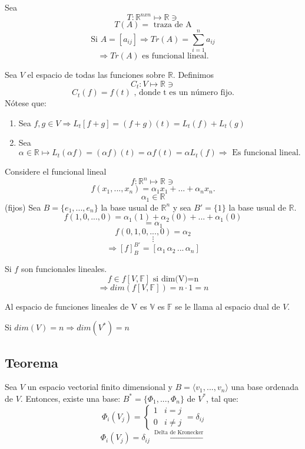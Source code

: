 \begin{exercise}
Sea $$T:\mathbb{R}^{nxn}\mapsto\mathbb{R}\ni$$
$$T(A)=\text{ traza de A}$$
$$\text{Si } A=[a_{ij}]\Rightarrow Tr(A) = \sum^n_{i=1}a_{ij}$$
$$\Rightarrow Tr(A) \text{ es funcional lineal.}$$
\end{exercise}
\begin{exercise}
Sea $V$ el espacio de todas las funciones sobre $\mathbb{R}$.
Definimos $$C_t: V\mapsto\mathbb{R}\ni$$
$$C_t(f)=f(t)\text{ , donde t es un número fijo.}$$
Nótese que:
\begin{enumerate}
    \item Sea $f,g\in V\Rightarrow L_t[f+g]=(f+g)(t)=L_t(f)+L_t(g)$
    \item Sea $\alpha\in\mathbb{R}\mapsto L_t(\alpha f)=(\alpha f)(t)=\alpha f(t)=\alpha L_t(f)\Rightarrow\text{ Es funcional lineal.}$
\end{enumerate}
\end{exercise}

\begin{notation}
Considere el funcional lineal $$f:\mathbb{R}^n\mapsto\mathbb{R}\ni$$$$f(x_1,...,x_n)=\alpha_1 x_1+...+\alpha_n x_n.$$
$$ \alpha_1\in\mathbb{R}$$ (fijos)
Sea $B=\{e_1,...,e_n\}$ la base usual de $\mathbb{R}^n$ y sea $B'=\{1\}$ la base usual de $\mathbb{R}$. $$f(1,0,...,0)=\alpha_1(1)+\alpha_2(0)+...+\alpha_1(0)$$
$$=\alpha_1$$
$$f(0,1,0,...,0)=\alpha_2$$
$$\vdots$$
$$\Rightarrow[f]^{B'}_B =[\alpha_1\,\alpha_2\,...\,\alpha_n]$$

\end{notation}

\begin{notation}
Si $f$ son funcionales lineales. 
$$f\in f[V,\mathbb{F}]\text{ si dim(V)=n}$$
$$\Rightarrow dim( f[V,\mathbb{F}])= n\cdot1=n$$
\end{notation}

\begin{definition}[$V^{*}$]
Al espacio de funciones lineales de V es $\mathbb{V}$ es $\mathbb{F}$ se le llama al espacio dual de $V$.
\end{definition}

\begin{notation}
Si $dim(V)=n \Rightarrow dim(V^*)=n$
\end{notation}

\subsection{Teorema}
\begin{theorem}
Sea $V$ un espacio vectorial finito dimensional y $B=\langle v_1,...,v_n\rangle$ una base ordenada de $V$. Entonces, existe una base: $B^* = \{\Phi_1,...,\Phi_n\}$ de $V^*$, tal que: 
$$\Phi_i(V_j)=
    \begin{cases} 
      1 & i=j \\
      0 & i\neq j  
   \end{cases} = \delta_{ij} $$
$$\Phi_i(V_j)=\delta_{ij}\xleftarrow{\text{ Delta de Kronecker}}$$


\end{theorem}

